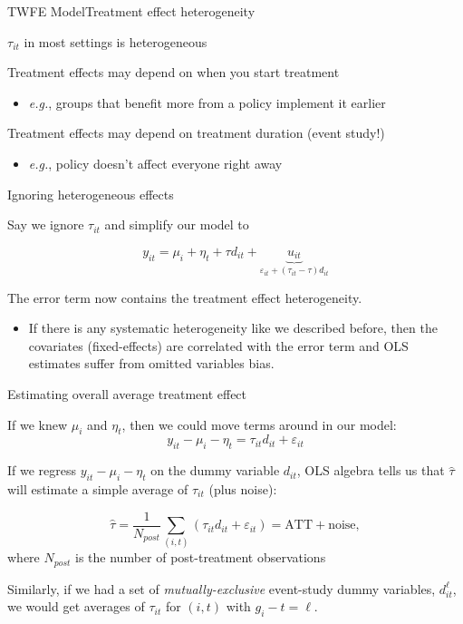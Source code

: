 \documentclass[t]{beamer}
\begin{document}
\begin{frame}{TWFE Model}{Treatment effect heterogeneity}
  \begin{center}
    $\tau_{it}$ in most settings is heterogeneous
  \end{center}
  
  \bigskip
  Treatment effects may depend on when you start treatment 
  \begin{itemize}
    \item \emph{e.g.}, groups that benefit more from a policy implement it earlier
  \end{itemize} 
  
  \bigskip
  Treatment effects may depend on treatment duration (event study!)
  \begin{itemize}
    \item \emph{e.g.}, policy doesn't affect everyone right away
  \end{itemize}
\end{frame}

\begin{frame}{Ignoring heterogeneous effects}

  Say we ignore $\tau_{it}$ and simplify our model to 

  $$
    y_{it} = \mu_i + \eta_t + \tau d_{it} + \underbrace{u_{it}}_{ \varepsilon_{it} + (\tau_{it} - \tau) d_{it} }
  $$

  \medskip
  The error term now contains the treatment effect heterogeneity. 
  \begin{itemize}
    \item If there is any systematic heterogeneity like we described before, then the covariates (fixed-effects) are correlated with the error term and OLS estimates suffer from omitted variables bias.
  \end{itemize}
\end{frame}

\begin{frame}{Estimating overall average treatment effect}

  If we knew $\mu_i$ and $\eta_t$, then we could move terms around in our model:
  $$
  y_{it} - \mu_i - \eta_t = \tau_{it} d_{it} + \varepsilon_{it}
  $$

  \pause
  \bigskip
  If we regress $y_{it} - \mu_i - \eta_t$ on the dummy variable $d_{it}$, OLS algebra tells us that $\hat{\tau}$ will estimate a simple average of $\tau_{it}$ (plus noise):

  $$
    \hat{\tau} = \frac{1}{N_{post}} \sum_{(i,t)} \left( \tau_{it} d_{it} + \varepsilon_{it} \right) = \text{ATT} + \text{noise},
  $$
  where $N_{post}$ is the number of post-treatment observations

  \pause
  \bigskip
  Similarly, if we had a set of \emph{mutually-exclusive} event-study dummy variables, $d_{it}^\ell$, we would get averages of $\tau_{it}$ for $(i,t)$ with $g_i - t = \ell$. 
\end{frame}
\end{document}
